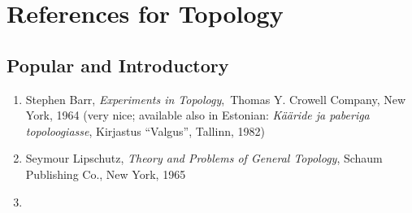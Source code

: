 \documentclass[12pt]{article}
\begin{document}
\section*{References for Topology}

\subsection*{Popular and Introductory}
\begin{enumerate}
\item Stephen Barr, {\em Experiments in Topology},\, Thomas Y. Crowell Company, New York, 1964 (very nice; available also in Estonian: {\em K\"a\"aride ja paberiga topoloogiasse}, Kirjastus ``Valgus'', Tallinn, 1982)
\item Seymour Lipschutz, {\em Theory and Problems of General Topology}, Schaum Publishing Co., New York, 1965
\item {}
\end{enumerate}
\end{document}
